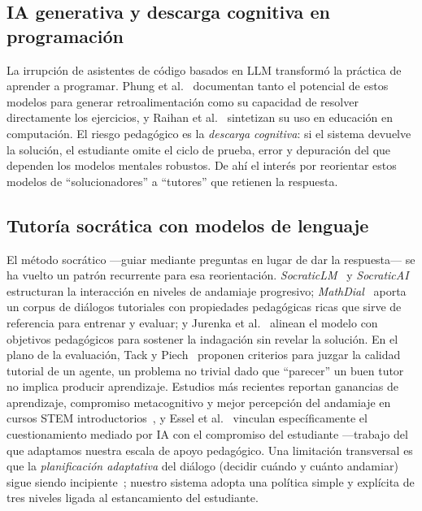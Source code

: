 \documentclass[conference]{IEEEtran}
\begin{document}
\subsection{IA generativa y descarga cognitiva en programaci\'on}
La irrupci\'on de asistentes de c\'odigo basados en LLM transform\'o la pr\'actica de aprender a
programar. Phung et al.~\cite{phung2023generative} documentan tanto el potencial de estos modelos
para generar retroalimentaci\'on como su capacidad de resolver directamente los ejercicios, y
Raihan et al.~\cite{raihan2025llms} sintetizan su uso en educaci\'on en computaci\'on. El riesgo
pedag\'ogico es la \emph{descarga cognitiva}: si el sistema devuelve la soluci\'on, el estudiante
omite el ciclo de prueba, error y depuraci\'on del que dependen los modelos mentales robustos. De
ah\'i el inter\'es por reorientar estos modelos de ``solucionadores'' a ``tutores'' que retienen la
respuesta.

\subsection{Tutor\'ia socr\'atica con modelos de lenguaje}
El m\'etodo socr\'atico ---guiar mediante preguntas en lugar de dar la respuesta--- se ha vuelto un
patr\'on recurrente para esa reorientaci\'on. \emph{SocraticLM}~\cite{liu2024socraticlm} y
\emph{SocraticAI}~\cite{sunil2025socraticai} estructuran la interacci\'on en niveles de andamiaje
progresivo; \emph{MathDial}~\cite{macina2023mathdial} aporta un corpus de di\'alogos tutoriales con
propiedades pedag\'ogicas ricas que sirve de referencia para entrenar y evaluar; y Jurenka et
al.~\cite{jurenka2024problem} alinean el modelo con objetivos pedag\'ogicos para sostener la
indagaci\'on sin revelar la soluci\'on. En el plano de la evaluaci\'on, Tack y
Piech~\cite{tack2022clean} proponen criterios para juzgar la calidad tutorial de un agente, un
problema no trivial dado que ``parecer'' un buen tutor no implica producir aprendizaje. Estudios
m\'as recientes reportan ganancias de aprendizaje, compromiso metacognitivo y mejor percepci\'on
del andamiaje en cursos STEM introductorios~\cite{ali2026tool,xi2026investigating,kao2025socratic},
y Essel et al.~\cite{essel2024aimediated} vinculan espec\'ificamente el cuestionamiento mediado por
IA con el compromiso del estudiante ---trabajo del que adaptamos nuestra escala de apoyo
pedag\'ogico. Una limitaci\'on transversal es que la \emph{planificaci\'on adaptativa} del di\'alogo
(decidir cu\'ando y cu\'anto andamiar) sigue siendo incipiente~\cite{dong2026learning}; nuestro
sistema adopta una pol\'itica simple y expl\'icita de tres niveles ligada al estancamiento del
estudiante.
\end{document}
